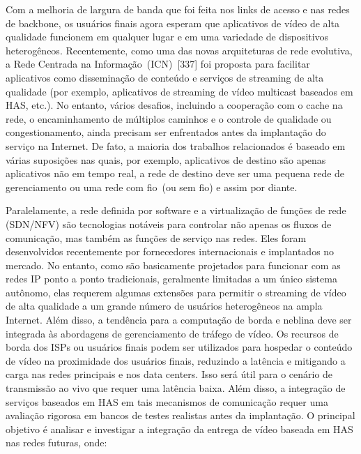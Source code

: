 Com a melhoria de largura de banda que foi feita nos links de acesso e nas redes de backbone, os usuários finais agora esperam que aplicativos de vídeo de alta qualidade funcionem em qualquer lugar e em uma variedade de dispositivos heterogêneos. Recentemente, como uma das novas arquiteturas de rede evolutiva, a Rede Centrada na Informação~(ICN)~[337] foi proposta para facilitar aplicativos como disseminação de conteúdo e serviços de streaming de alta qualidade (por exemplo, aplicativos de streaming de vídeo multicast baseados em HAS, etc.). No entanto, vários desafios, incluindo a cooperação com o cache na rede, o encaminhamento de múltiplos caminhos e o controle de qualidade ou congestionamento, ainda precisam ser enfrentados antes da implantação do serviço na Internet. De fato, a maioria dos trabalhos relacionados é baseado em várias suposições nas quais, por exemplo, aplicativos de destino são apenas aplicativos não em tempo real, a rede de destino deve ser uma pequena rede de gerenciamento ou uma rede com fio~(ou sem fio) e assim por diante. 

Paralelamente, a rede definida por software e a virtualização de funções de rede (SDN/NFV) são tecnologias notáveis para controlar não apenas os fluxos de comunicação, mas também as funções de serviço nas redes. Eles foram desenvolvidos recentemente por fornecedores internacionais e implantados no mercado. No entanto, como são basicamente projetados para funcionar com as redes IP ponto a ponto tradicionais, geralmente limitadas a um único sistema autônomo, elas requerem algumas extensões para permitir o streaming de vídeo de alta qualidade a um grande número de usuários heterogêneos na ampla Internet. 
Além disso, a tendência para a computação de borda e neblina deve ser integrada às abordagens de gerenciamento de tráfego de vídeo. Os recursos de borda dos ISPs ou usuários finais podem ser utilizados para hospedar o conteúdo de vídeo na proximidade dos usuários finais, reduzindo a latência e mitigando a carga nas redes principais e nos data centers. Isso será útil para o cenário de transmissão ao vivo que requer uma latência baixa. Além disso, a integração de serviços baseados em HAS em tais mecanismos de comunicação requer uma avaliação rigorosa em bancos de testes realistas antes da implantação. O principal objetivo é analisar e investigar a integração da entrega de vídeo baseada em HAS nas redes futuras, onde:


%


